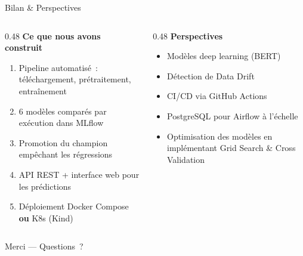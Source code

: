 \documentclass[aspectratio=169, 11pt]{beamer}
\begin{document}
\begin{frame}{Bilan \& Perspectives}
\small
\begin{columns}[T]
\begin{column}{0.48\textwidth}
\textbf{\faCheckCircle[regular]\; Ce que nous avons construit}
\begin{enumerate}\setlength{\itemsep}{1pt}
  \item Pipeline automatis\'e~: t\'el\'echargement, pr\'etraitement, entra\^inement
  \item 6 mod\`eles compar\'es par ex\'ecution dans MLflow
  \item Promotion du champion emp\^echant les r\'egressions
  \item API REST + interface web pour les pr\'edictions
  \item D\'eploiement Docker Compose \textbf{ou} K8s (Kind)
\end{enumerate}
\end{column}

\begin{column}{0.48\textwidth}
\textbf{\faRocket\; Perspectives}
\begin{itemize}\setlength{\itemsep}{1pt}
  \item Mod\`eles deep learning (BERT)
  \item D\'etection de Data Drift
  \item CI/CD via GitHub Actions
  \item PostgreSQL pour Airflow \`a l'\'echelle
  \item Optimisation des modèles en implémentant Grid Search \& Cross Validation

\end{itemize}
\end{column}
\end{columns}

\vspace{0.4em}
\centering
{\Large \alert{Merci --- Questions~?}}
\end{frame}
\end{document}
